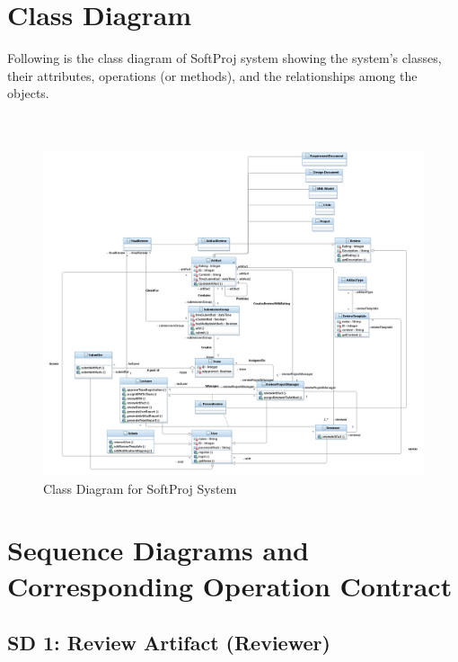   \section{Class Diagram}
  Following is the class diagram of SoftProj system showing the system's classes, their attributes, operations (or methods), and the relationships among the objects.
  \\
  \\
  \\
  \begin{figure}[h]
\includegraphics[width=16cm]{content/CD.jpeg}
\centering

\caption{Class Diagram for SoftProj System}
\end{figure}
  \newpage
 \section{Sequence Diagrams and Corresponding Operation Contract }   
\subsection*{SD 1: Review Artifact (Reviewer)}

